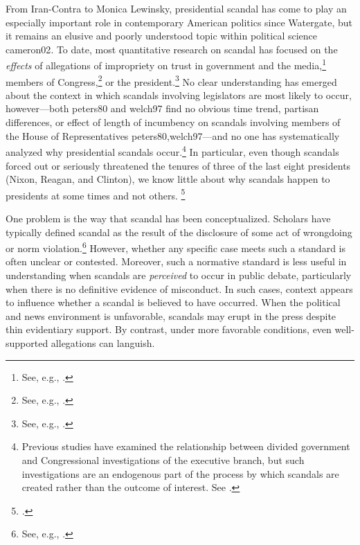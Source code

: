 \documentclass{cupjournal}
\begin{document}
From Iran-Contra to Monica Lewinsky, presidential scandal has come to play an especially important role in contemporary American politics since Watergate, but it remains an elusive and poorly understood topic within political science {cameron02}. To date, most quantitative research on scandal has focused on the \emph{effects} of allegations of impropriety on trust in government and the media,\footnote{See, e.g., \cite{bechtelscheve2013,bechteletal2013framing}.} members of Congress,\footnote{See, e.g., \cite{bechtelschmid2013,calleexplainingelectoral2010}.} or the president.\footnote{See, e.g., \cite{abrajanonatural2005,cohenetal1997,Andonovaetal2009}.}
No clear understanding has emerged about the context in which scandals involving legislators are most likely to occur, however---both {peters80} and {welch97} find no obvious time trend, partisan differences, or effect of length of incumbency on scandals involving members of the House of Representatives {peters80,welch97}---and no one has systematically analyzed why presidential scandals occur.\footnote{Previous studies have examined the relationship between divided government and Congressional investigations of the executive branch, but such investigations are an endogenous part of the process by which scandals are created rather than the outcome of interest. See \cite{Ariely1998,atheydiffndiff2005,aulisietal2007}.} In particular, even though scandals forced out or seriously threatened the tenures of three of the last eight presidents (Nixon, Reagan, and Clinton), we know little about why scandals happen to presidents at some times and not others.
\footcite[183]{Ariely1998}

One problem is the way that scandal has been conceptualized. Scholars have typically defined scandal as the result of the disclosure of some act of wrongdoing or norm violation.\footnote{See, e.g., \cite{apostolidis04}.} However, whether any specific case meets such a standard is often unclear or contested. Moreover, such a normative standard is less useful in understanding when scandals are \emph{perceived} to occur in public debate, particularly when there is no definitive evidence of misconduct. In such cases, context appears to influence whether a scandal is believed to have occurred. When the political and news environment is unfavorable, scandals may erupt in the press despite thin evidentiary support. By contrast, under more favorable conditions, even well-supported allegations can languish.
\end{document}
